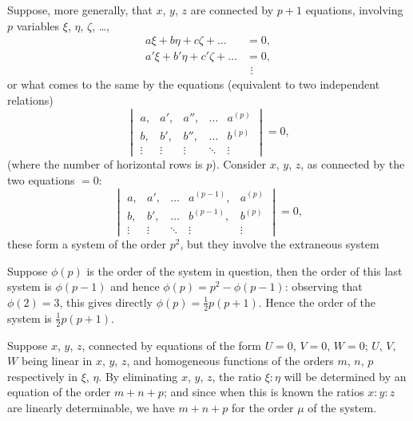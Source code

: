 \documentclass[11pt,a4paper]{book}
\begin{document}
Suppose, more generally, that $x$, $y$, $z$ are connected by $p + 1$ equations, involving $p$ variables $\xi$, $\eta$, $\zeta$, \ldots,
\begin{align*}
a\xi + b\eta + c\zeta + \ldots &= 0, \\
a'\xi + b'\eta + c'\zeta + \ldots &= 0, \\
&\ \,\vdots
\end{align*}
or what comes to the same by the equations (equivalent to two independent relations)
\[
\begin{vmatrix}
a, & a', & a'', & \ldots & a^{(p)} \\
b, & b', & b'', & \ldots & b^{(p)} \\
\vdots & \vdots & \vdots & \ddots & \vdots
\end{vmatrix} = 0,
\]
(where the number of horizontal rows is $p$). Consider $x$, $y$, $z$, as connected by the two equations $= 0$:
\[
\begin{vmatrix}
a, & a', & \ldots & a^{(p-1)}, & a^{(p)} \\
b, & b', & \ldots & b^{(p-1)}, & b^{(p)} \\
\vdots & \vdots & \ddots & \vdots & \vdots
\end{vmatrix} = 0,
\]
these form a system of the order $p^{2}$, but they involve the extraneous system

\newpage

\setcounter{page}{459}

Suppose $\phi(p)$ is the order of the system in question, then the order of this last system is $\phi(p-1)$ and hence $\phi(p) = p^{2} - \phi(p-1)$: observing that $\phi(2) = 3$, this gives directly $\phi(p) = \frac{1}{2}p(p+1)$. Hence the order of the system is $\frac{1}{2}p(p+1)$.

Suppose $x$, $y$, $z$, connected by equations of the form $U = 0$, $V = 0$, $W = 0$; $U$, $V$, $W$ being linear in $x$, $y$, $z$, and homogeneous functions of the orders $m$, $n$, $p$ respectively in $\xi$, $\eta$. By eliminating $x$, $y$, $z$, the ratio $\xi : \eta$ will be determined by an equation of the order $m + n + p$; and since when this is known the ratios $x : y : z$ are linearly determinable, we have $m + n + p$ for the order $\mu$ of the system.
\end{document}
